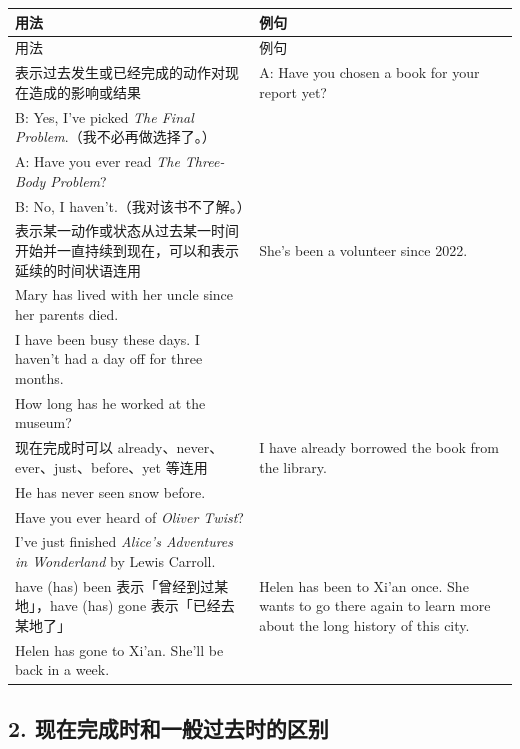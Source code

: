 \documentclass[11pt,a4paper]{ctexart}
\begin{document}
{\footnotesize
\begin{longtable}{p{6.70cm}p{6.70cm}}
\hline
用法 & 例句 \\
\hline
\endfirsthead
\hline
用法 & 例句 \\
\hline
\endhead
\hline
\endfoot
表示过去发生或已经完成的动作对现在造成的影响或结果 & A: Have you chosen a book for your report yet?\\ B: Yes, I’ve picked \emph{The Final Problem}.（我不必再做选择了。）\\ A: Have you ever read \emph{The Three-Body Problem}?\\ B: No, I haven’t.（我对该书不了解。） \\
表示某一动作或状态从过去某一时间开始并一直持续到现在，可以和表示延续的时间状语连用 & She’s been a volunteer since 2022.\\ Mary has lived with her uncle since her parents died.\\ I have been busy these days. I haven’t had a day off for three months.\\ How long has he worked at the museum? \\
现在完成时可以 already、never、ever、just、before、yet 等连用 & I have already borrowed the book from the library.\\ He has never seen snow before.\\ Have you ever heard of \emph{Oliver Twist}?\\ I’ve just finished \emph{Alice’s Adventures in Wonderland} by Lewis Carroll. \\
have (has) been 表示「曾经到过某地」，have (has) gone 表示「已经去某地了」 & Helen has been to Xi’an once. She wants to go there again to learn more about the long history of this city.\\ Helen has gone to Xi’an. She’ll be back in a week. \\
\end{longtable}
}

\begin{center}\end{center}

\subsection*{2. 现在完成时和一般过去时的区别}
\end{document}
